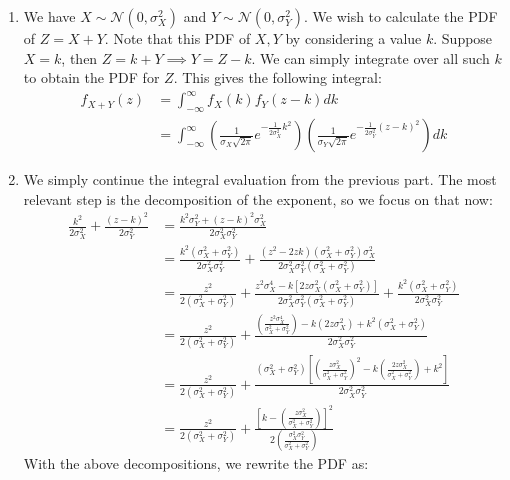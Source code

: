 \documentclass[submit]{harvardml}
\theoremstyle{plain}
\begin{document}
\begin{enumerate}[label=(\alph*)]
\item We have $X \sim \mathcal{N}(0, \sigma_X^2)$ and $Y \sim \mathcal{N}(0, \sigma_Y^2)$. We wish to calculate the PDF of $Z = X + Y$. Note that this PDF of $X,Y$ by considering a value $k$. Suppose $X = k$, then $Z = k + Y \implies Y = Z - k$. We can simply integrate over all such $k$ to obtain the PDF for $Z$. This gives the following integral:
\begin{align*}
f_{X+Y}(z) &= \int_{-\infty}^{\infty} f_X(k)f_Y(z-k) dk \tag{by independence}\\
&= \int_{-\infty}^{\infty} \left(\frac{1}{\sigma_X\sqrt{2\pi}}e^{-\frac{1}{2\sigma_X^2}k^2} \right) \left(\frac{1}{\sigma_Y\sqrt{2\pi}}e^{-\frac{1}{2\sigma_Y^2}(z-k)^2} \right) dk
\end{align*}
\item We simply continue the integral evaluation from the previous part. The most relevant step is the decomposition of the exponent, so we focus on that now:
\begin{align*}
\frac{k^2}{2\sigma_X^2} + \frac{(z-k)^2}{2\sigma_Y^2} &= \frac{k^2\sigma_Y^2 + (z-k)^2\sigma_X^2}{2\sigma_X^2\sigma_Y^2}\\
&= \frac{k^2(\sigma_X^2 + \sigma_Y^2)}{2\sigma_X^2\sigma_Y^2} + \frac{(z^2-2zk)(\sigma_X^2 + \sigma_Y^2)\sigma_X^2}{2\sigma_X^2\sigma_Y^2(\sigma_X^2 + \sigma_Y^2)} \\
&=\frac{z^2}{2(\sigma_X^2 + \sigma_Y^2)} + \frac{z^2\sigma_X^4 - k[2z\sigma_X^2(\sigma_X^2 + \sigma_Y^2)]}{2\sigma_X^2\sigma_Y^2(\sigma_X^2 + \sigma_Y^2)} + \frac{k^2(\sigma_X^2 + \sigma_Y^2)}{2\sigma_X^2\sigma_Y^2} \\
&= \frac{z^2}{2(\sigma_X^2 + \sigma_Y^2)} + \frac{\left(\frac{z^2\sigma_X^4}{\sigma_X^2 + \sigma_Y^2} \right) - k\left(2z\sigma_X^2 \right) + k^2(\sigma_X^2 + \sigma_Y^2)}{2\sigma_X^2\sigma_Y^2} \\
&= \frac{z^2}{2(\sigma_X^2 + \sigma_Y^2)} + \frac{(\sigma_X^2 + \sigma_Y^2)\left[ \left(\frac{z\sigma_X^2}{\sigma_X^2 + \sigma_Y^2}\right)^2 - k \left(\frac{2z\sigma_X^2}{\sigma_X^2 + \sigma_Y^2} \right) + k^2 \right]}{2\sigma_X^2\sigma_Y^2} \\
&= \frac{z^2}{2(\sigma_X^2 + \sigma_Y^2)} + \frac{\left[k - \left(\frac{z\sigma_X^2}{\sigma_X^2 + \sigma_Y^2} \right)\right]^2}{2\left(\frac{\sigma_X^2\sigma_Y^2}{\sigma_X^2 + \sigma_Y^2} \right)}
\end{align*}
With the above decompositions, we rewrite the PDF as:
\begin{align*}

\end{align*}
\end{enumerate}
\end{document}
